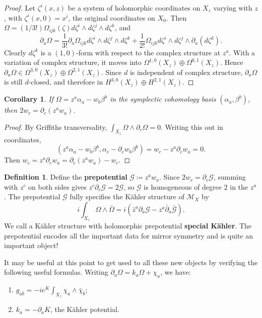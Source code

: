 \documentclass{report}
\theoremstyle{plain}
\newtheorem{corollary}[theorem]{Corollary}
\theoremstyle{definition}
\newtheorem{definition}[theorem]{Definition}
\theoremstyle{remark}
\newcommand{\di}{\partial}
\newcommand{\cG}{\mathcal{G}}
\newcommand{\cM}{\mathcal{M}}
\newcommand{\bz}{\bar{z}}
\newcommand{\bdi}{\bar{\di}}
\begin{document}
\begin{proof}
  Let $\zeta^i(x, z)$ be a system of holomorphic coordinates on $X_z$
  varying with $z$, with $\zeta^i(x, 0) = x^i$, the original
  coordinates on $X_0$. Then $\Omega = (1/3!) \Omega_{ijk}(\zeta)
  d\zeta^i \wedge d\zeta^j \wedge d\zeta^k$, and
  \[ \di_a\Omega = \frac{1}{3!} \di_a \Omega_{ijk} d\zeta^i \wedge d\zeta^j \wedge d\zeta^k + \frac{1}{2!} \Omega_{ijk} d\zeta^i \wedge d\zeta^j \wedge \di_a(d\zeta^k). \]
  Clearly $d\zeta^k$ is a $(1,0)$-form with respect to the complex
  structure at $z^a$. With a variation of complex structure, it moves
  into $\Omega^{1,0}(X_z) \oplus \Omega^{0,1}(X_z)$. Hence
  $\di_a\Omega \in \Omega^{3,0}(X_z) \oplus \Omega^{2,1}(X_z)$. Since
  $d$ is independent of complex structure, $\di_a\Omega$ is still
  $d$-closed, and therefore in $H^{3,0}(X_z) \oplus H^{2,1}(X_z)$.
\end{proof}

\begin{corollary}
  If $\Omega = z^a \alpha_a - w_b \beta^b$ in the symplectic
  cohomology basis $(\alpha_a, \beta^b)$, then $2w_c = \di_c(z^a
  w_a)$.
\end{corollary}

\begin{proof}
  By Griffiths transversality, $\int_{X_z} \Omega \wedge \di_c\Omega =
  0$. Writing this out in coordinates,
  \[ (z^a \alpha_a - w_b \beta^b, \alpha_c - \di_c w_b \beta^b) = w_c - z^a \di_c w_a = 0. \]
  Then $w_c = z^a \di_c w_a = \di_c(z^a w_a) - w_c$.
\end{proof}

\begin{definition} \label{def:gauss-manin-prepotential}
  Define the {\bf prepotential} $\cG \coloneqq z^aw_a$. Since $2w_c =
  \di_c\cG$, summing with $z^c$ on both sides gives $z^c \di_c \cG =
  2\cG$, so $\cG$ is homogeneous of degree $2$ in the $z^a$. The
  prepotential $\cG$ fully specifies the K\"ahler structure of $\cM_X$
  by
  \[ i \int_{X_z} \Omega \wedge \bar{\Omega} = i(\bz^a \di_a \cG - z^a \bdi_a \bar{\cG}). \]
  We call a K\"ahler structure with holomorphic prepotential {\bf
    special K\"ahler}. The prepotential encodes all the important data
  for mirror symmetry and is quite an important object!
\end{definition}

It may be useful at this point to get used to all these new objects by
verifying the following useful formulas. Writing $\di_a\Omega = k_a
\Omega + \chi_a$, we have:
\begin{enumerate}
\item $g_{a\bar{b}} = -ie^K \int_{X_z} \chi_a \wedge \bar{\chi}_{\bar{b}}$;
\item $k_a = -\di_a K$, the K\"ahler potential.
\end{enumerate}
\end{document}
